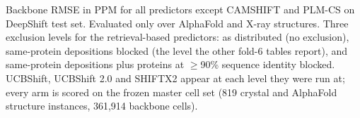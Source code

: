 Backbone RMSE in PPM for all predictors except CAMSHIFT and PLM-CS on DeepShift test set. Evaluated only over AlphaFold and X-ray structures. Three exclusion levels for the retrieval-based predictors: as distributed (no exclusion), same-protein depositions blocked (the level the other fold-6 tables report), and same-protein depositions plus proteins at $\geq$90\% sequence identity blocked. UCBShift, UCBShift 2.0 and SHIFTX2 appear at each level they were run at; every arm is scored on the frozen master cell set (819 crystal and AlphaFold structure instances, 361,914 backbone cells).
